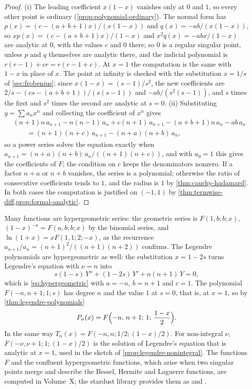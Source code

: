 \begin{proof}
(i) The leading coefficient $x(1-x)$ vanishes only at $0$ and $1$, so every other point is ordinary (\cref{prop:polynomial-ordinary}). The normal form has $p(x)=(c-(a+b+1)x)/(x(1-x))$ and $q(x)=-ab/(x(1-x))$, so $xp(x)=(c-(a+b+1)x)/(1-x)$ and $x^2q(x)=-abx/(1-x)$ are analytic at $0$, with the values $c$ and $0$ there; so $0$ is a regular singular point, unless $p$ and $q$ themselves are analytic there, and the indicial polynomial is $r(r-1)+cr=r(r-1+c)$. At $x=1$ the computation is the same with $1-x$ in place of $x$. The point at infinity is checked with the substitution $x=1/s$ of \cref{sec:frobenius}: since $x(1-x)=(s-1)/s^2$, the new coefficients are $2/s-(cs-(a+b+1))/(s(s-1))$ and $-ab/(s^2(s-1))$, and $s$ times the first and $s^2$ times the second are analytic at $s=0$. (ii) Substituting $y=\sum a_nx^n$ and collecting the coefficient of $x^n$ gives
\begin{align*}
&(n+1)n\,a_{n+1}-n(n-1)\,a_n+c(n+1)\,a_{n+1}-(a+b+1)n\,a_n-ab\,a_n\\
&\qquad=(n+1)(n+c)\,a_{n+1}-(n+a)(n+b)\,a_n ,
\end{align*}
so a power series solves the equation exactly when $a_{n+1}=(n+a)(n+b)\,a_n/((n+1)(n+c))$, and with $a_0=1$ this gives the coefficients of $F$; the condition on $c$ keeps the denominators nonzero. If a factor $n+a$ or $n+b$ vanishes, the series is a polynomial; otherwise the ratio of consecutive coefficients tends to $1$, and the radius is $1$ by \cref{thm:cauchy-hadamard}. In both cases the computation is justified on $(-1,1)$ by \cref{thm:termwise-diff,prop:formal-analytic}.
\end{proof}

Many functions are hypergeometric series: the geometric series is $F(1,b;b;x)$, $(1-x)^{-a}=F(a,b;b;x)$ by the binomial series, and $\ln(1+x)=xF(1,1;2;-x)$, as the recurrence $a_{n+1}/a_n=(n+1)^2/((n+1)(n+2))$ confirms. The Legendre polynomials are hypergeometric as well: the substitution $x=1-2s$ turns Legendre's equation with $\nu=n$ into
\[
s(1-s)\,Y''+(1-2s)\,Y'+n(n+1)\,Y=0 ,
\]
which is \eqref{eq:hypergeometric} with $a=-n$, $b=n+1$ and $c=1$. The polynomial $F(-n,n+1;1;s)$ has degree $n$ and the value $1$ at $s=0$, that is, at $x=1$, so by \cref{thm:legendre-polynomials}
\[
P_n(x)=F\Bigl(-n,\,n+1;\,1;\,\frac{1-x}2\Bigr) .
\]
In the same way $T_n(x)=F(-n,n;1/2;(1-x)/2)$. For non-integral $\nu$, $F(-\nu,\nu+1;1;(1-x)/2)$ is the solution of Legendre's equation that is analytic at $x=1$, used in the sketch of \cref{prop:legendre-nonintegral}. The functions $F$ and the confluent hypergeometric functions, which arise when two singular points merge and describe the Bessel, Hermite and Laguerre functions, are computed in Volume~X; the stardust library provides them as  and .

